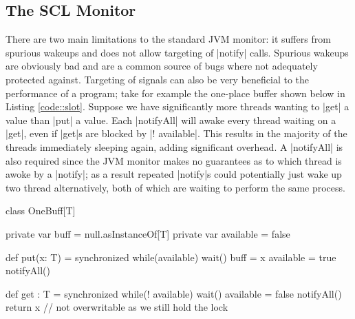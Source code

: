 \subsection{The SCL Monitor}


There are two main limitations to the standard JVM monitor: it suffers from spurious wakeups and does not allow targeting of |notify| calls. Spurious wakeups are obviously bad and are a common source of bugs where not adequately protected against. Targeting of signals can also be very beneficial to the performance of a program; take for example the one-place buffer shown below in Listing \ref{code::slot}. Suppose we have significantly more threads wanting to |get| a value than |put| a value. Each |notifyAll| will awake every thread waiting on a |get|, even if |get|s are blocked by |! available|. This results in the majority of the threads immediately sleeping again, adding significant overhead. A |notifyAll| is also required since the JVM monitor makes no guarantees as to which thread is awoke by a |notify|; as a result repeated |notify|s could potentially just wake up two thread alternatively, both of which are waiting to perform the same process.

\begin{scala}[label=code::slot, caption={Single placed buffer as an example of the inefficiency of untargeted signals}]
  class OneBuff[T] {
    private var buff = null.asInstanceOf[T]
    private var available = false

    def put(x: T) = synchronized {
      while(available) wait()
      buff = x
      available = true
      notifyAll()
    }

    def get : T = synchronized {
      while(! available) wait()
      available = false
      notifyAll()
      return x // not overwritable as we still hold the lock
    }
  }
\end{scala}

